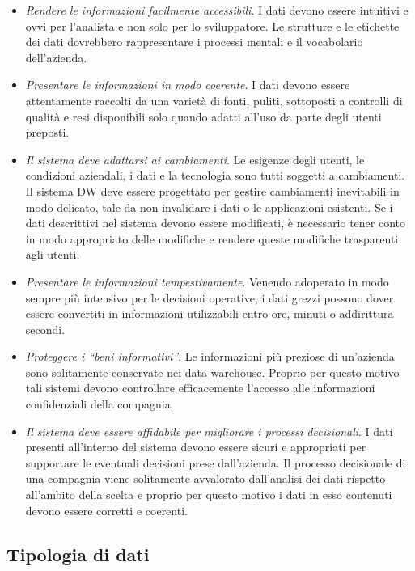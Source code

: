 \begin{itemize}
    \item \textit{Rendere le informazioni facilmente accessibili}. I dati devono essere intuitivi e ovvi per l’analista e non solo per lo sviluppatore. Le strutture e le etichette dei dati dovrebbero rappresentare i processi mentali e il vocabolario dell’azienda. 
    \item \textit{Presentare le informazioni in modo coerente}. I dati devono essere attentamente raccolti da una varietà di fonti, puliti, sottoposti a controlli di qualità e resi disponibili solo quando adatti all’uso da parte degli utenti preposti.
    \item \textit{Il sistema deve adattarsi ai cambiamenti}. Le esigenze degli utenti, le condizioni aziendali, i dati e la tecnologia sono tutti soggetti a cambiamenti. Il sistema DW deve essere progettato per gestire cambiamenti inevitabili in modo delicato, tale da non invalidare i dati o le applicazioni esistenti. Se i dati descrittivi nel sistema devono essere modificati, è necessario tener conto in modo appropriato delle modifiche e rendere queste modifiche trasparenti agli utenti.
    \item \textit{Presentare le informazioni tempestivamente}. Venendo adoperato in modo sempre più intensivo per le decisioni operative, i dati grezzi possono dover essere convertiti in informazioni utilizzabili entro ore, minuti o addirittura secondi.
    \item \textit{Proteggere i “beni informativi”}. Le informazioni più preziose di un’azienda sono solitamente conservate nei data warehouse. Proprio per questo motivo tali sistemi devono controllare efficacemente l’accesso alle informazioni confidenziali della compagnia.
    \item \textit{Il sistema deve essere affidabile per migliorare i processi decisionali}. I dati presenti all’interno del sistema devono essere sicuri e appropriati per supportare le eventuali decisioni prese dall’azienda. Il processo decisionale di una compagnia viene solitamente avvalorato dall’analisi dei dati rispetto all’ambito della scelta e proprio per questo motivo i dati in esso contenuti devono essere corretti e coerenti.
\end{itemize}

\subsection{Tipologia di dati}

